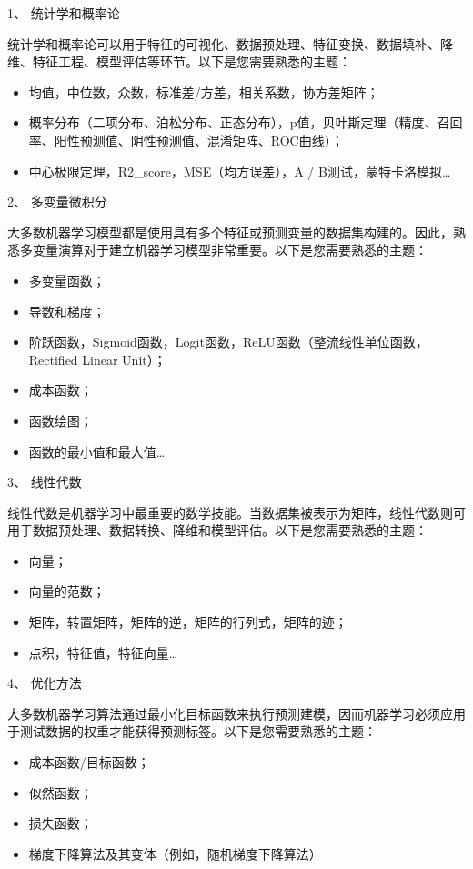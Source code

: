 \documentclass[]{ctexbook}
\begin{document}
1、 统计学和概率论

统计学和概率论可以用于特征的可视化、数据预处理、特征变换、数据填补、降维、特征工程、模型评估等环节。以下是您需要熟悉的主题：

\begin{itemize}
\item
  均值，中位数，众数，标准差/方差，相关系数，协方差矩阵；
\item
  概率分布（二项分布、泊松分布、正态分布），p值，贝叶斯定理（精度、召回率、阳性预测值、阴性预测值、混淆矩阵、ROC曲线）；
\item
  中心极限定理，R2\_score，MSE（均方误差），A / B测试，蒙特卡洛模拟\ldots{}
\end{itemize}

2、 多变量微积分

大多数机器学习模型都是使用具有多个特征或预测变量的数据集构建的。因此，熟悉多变量演算对于建立机器学习模型非常重要。以下是您需要熟悉的主题：

\begin{itemize}
\item
  多变量函数；
\item
  导数和梯度；
\item
  阶跃函数，Sigmoid函数，Logit函数，ReLU函数（整流线性单位函数，Rectified Linear Unit）；
\item
  成本函数；
\item
  函数绘图；
\item
  函数的最小值和最大值\ldots{}
\end{itemize}

3、 线性代数

线性代数是机器学习中最重要的数学技能。当数据集被表示为矩阵，线性代数则可用于数据预处理、数据转换、降维和模型评估。以下是您需要熟悉的主题：

\begin{itemize}
\item
  向量；
\item
  向量的范数；
\item
  矩阵，转置矩阵，矩阵的逆，矩阵的行列式，矩阵的迹；
\item
  点积，特征值，特征向量\ldots{}
\end{itemize}

4、 优化方法

大多数机器学习算法通过最小化目标函数来执行预测建模，因而机器学习必须应用于测试数据的权重才能获得预测标签。以下是您需要熟悉的主题：

\begin{itemize}
\item
  成本函数/目标函数；
\item
  似然函数；
\item
  损失函数；
\item
  梯度下降算法及其变体（例如，随机梯度下降算法）
\end{itemize}
\end{document}
